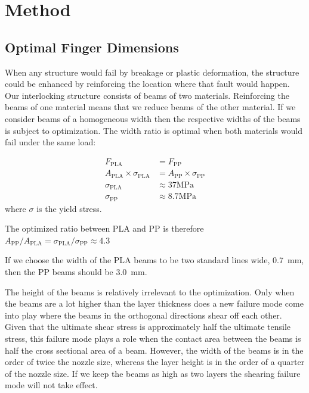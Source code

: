 

\section{Method}


\newpage

\subsection{Optimal Finger Dimensions}

When any structure would fail by breakage or plastic deformation,
the structure could be enhanced by reinforcing the location where that fault would happen.
Our interlocking structure consists of beams of two materials.
Reinforcing the beams of one material means that we reduce beams of the other material.
If we consider beams of a homogeneous width then the respective widths of the beams is subject to optimization.
The width ratio is optimal when both materials would fail under the same load:

\begin{align*}
	F_\text{PLA} &= F_\text{PP} \\
	A_\text{PLA} \times \sigma_\text{PLA} &= 	A_\text{PP} \times \sigma_\text{PP}\\
	\sigma_\text{PLA} &\approx 37 \si{\mega\pascal} \\
	\sigma_\text{PP} &\approx 8.7 \si{\mega\pascal}
\end{align*}
where $\sigma$ is the yield stress.

The optimized ratio between PLA and PP is therefore
$
A_\text{PP} / A_\text{PLA} = \sigma_\text{PLA} / \sigma_\text{PP}  \approx 4.3
$

If we choose the width of the PLA beams to be two standard lines wide, \SI{0.7}{\milli\meter}, then the PP beams should be \SI{3.0}{\milli\meter}.




The height of the beams is relatively irrelevant to the optimization.
Only when the beams are a lot higher than the layer thickness does a new failure mode come into play where the beams in the orthogonal directions shear off each other.
Given that the ultimate shear stress is approximately half the ultimate tensile stress,
this failure mode plays a role when the contact area between the beams is half the cross sectional area of a beam.
However, the width of the beams is in the order of twice the nozzle size, whereas the layer height is in the order of a quarter of the nozzle size.
If we keep the beams as high as two layers the shearing failure mode will not take effect.



